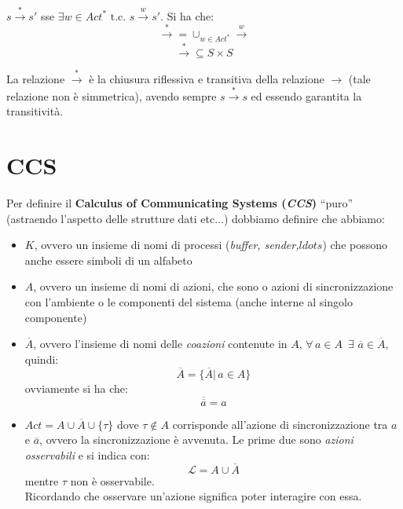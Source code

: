 \begin{definizione}
  $s\stackrel{*}{\rightarrow} s'$ sse $\exists w\in Act^*\mbox{ t.c. }
  s\stackrel{w}{\rightarrow} s'$. Si ha che:
  \[\stackrel{*}{\rightarrow}=\cup_{w\in Act^*}\stackrel{w}{\rightarrow}\]
  \[\stackrel{*}{\rightarrow}\subseteq S\times S\]
\end{definizione} \vspace{5mm} %
\begin{nota}
   La relazione $\stackrel{*}{\rightarrow}$ è la chiusura riflessiva e transitiva
  della relazione $\rightarrow$ (tale relazione non è simmetrica), avendo sempre
  $s\stackrel{*}{\rightarrow}s$ ed essendo garantita la transitività.
\end{nota}
\section{CCS}
\begin{definizione}
  Per definire il \textbf{Calculus of Communicating Systems (\textit{CCS})}
  ``puro'' (astraendo l'aspetto delle strutture dati etc$\ldots$) dobbiamo
  definire che abbiamo: 
  \begin{itemize}
    \item $K$, ovvero un insieme di nomi di processi (\textit{buffer,
      sender,$ldots$}) che possono anche essere simboli di un alfabeto
    \item $A$, ovvero un insieme di nomi di azioni, che sono o azioni di
    sincronizzazione con l'ambiente o le componenti del sistema (anche interne
    al singolo componente)
    \item $\overline{A}$, ovvero l'insieme di nomi delle \textit{coazioni}
    contenute in $A$, $\forall\, a\in A\,\,\,\exists\,\, \overline{a}\in
    \overline{A}$, quindi:
    \[\overline{A}=\{\overline{A}|\, a\in A\}\]
    ovviamente si ha che:
    \[\overline{\overline{a}}=a\]
    \item $Act=A\cup \overline{A}\cup \{\tau\}$ dove $\tau\not\in A$ corrisponde
    all'azione di sincronizzazione tra $a$ e $\overline{a}$, ovvero la
    sincronizzazione è avvenuta. Le prime due sono \textit{azioni osservabili} e
    si indica con:
    \[\mathcal{L}=A\cup \overline{A}\]
    mentre $\tau$ non è osservabile.\\
    Ricordando che osservare un'azione significa poter interagire con essa.
  \end{itemize}
\end{definizione} \vspace{5mm} %
